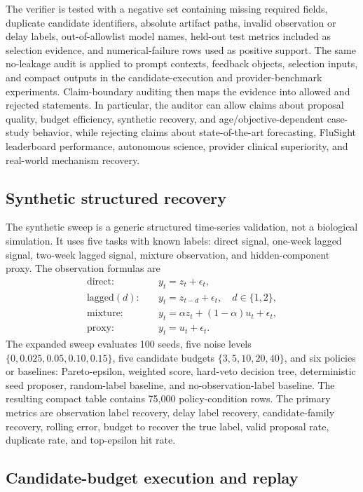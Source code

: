 The verifier is tested with a negative set containing missing required fields,
duplicate candidate identifiers, absolute artifact paths, invalid observation
or delay labels, out-of-allowlist model names, held-out test metrics included
as selection evidence, and numerical-failure rows used as positive support.
The same no-leakage audit is applied to prompt contexts, feedback objects,
selection inputs, and compact outputs in the candidate-execution and
provider-benchmark experiments. Claim-boundary auditing then maps the evidence
into allowed and rejected statements. In particular, the auditor can allow
claims about proposal quality, budget efficiency, synthetic recovery, and
age/objective-dependent case-study behavior, while rejecting claims about
state-of-the-art forecasting, FluSight leaderboard performance, autonomous
science, provider clinical superiority, and real-world mechanism recovery.

\subsection{Synthetic structured recovery}

The synthetic sweep is a generic structured time-series validation, not a
biological simulation. It uses five tasks with known labels: direct signal,
one-week lagged signal, two-week lagged signal, mixture observation, and
hidden-component proxy. The observation formulas are
\begin{align}
\mathrm{direct}:&\quad y_t=z_t+\epsilon_t,\\
\mathrm{lagged}(d):&\quad y_t=z_{t-d}+\epsilon_t,\quad d\in\{1,2\},\\
\mathrm{mixture}:&\quad y_t=\alpha z_t+(1-\alpha)u_t+\epsilon_t,\\
\mathrm{proxy}:&\quad y_t=u_t+\epsilon_t.
\end{align}
The expanded sweep evaluates 100 seeds, five noise levels
$\{0,0.025,0.05,0.10,0.15\}$, five candidate budgets
$\{3,5,10,20,40\}$, and six policies or baselines: Pareto-epsilon, weighted
score, hard-veto decision tree, deterministic seed proposer, random-label
baseline, and no-observation-label baseline. The resulting compact table
contains 75,000 policy-condition rows. The primary metrics are observation
label recovery, delay label recovery, candidate-family recovery, rolling
error, budget to recover the true label, valid proposal rate, duplicate rate,
and top-epsilon hit rate.

\subsection{Candidate-budget execution and replay}

